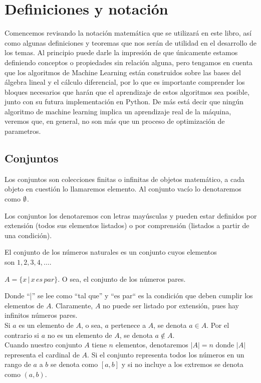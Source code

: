 \section{Definiciones y notación}

Comencemos revisando la notación matemática que se utilizará en este libro, así como algunas definiciones y teoremas que nos serán de utilidad en el desarrollo de los temas.
Al principio puede darle la impresión de que únicamente estamos definiendo conceptos o propiedades sin relación alguna, pero tengamos en cuenta 
que los algoritmos de Machine Learning están construidos sobre las bases del álgebra lineal y el cálculo diferencial, por lo que es importante
comprender los bloques necesarios que harán que el aprendizaje de estos algoritmos sea posible, junto con su futura implementación en Python.
De más está decir que ningún algoritmo de machine learning implica un aprendizaje real de la máquina, veremos que, en general, no son más que un proceso de optimización de parametros.

\subsection{Conjuntos}

\begin{definition}
    Los conjuntos son colecciones finitas o infinitas de objetos matemático, a cada objeto en cuestión lo llamaremos elemento. 
    Al conjunto vacío lo denotaremos como $\emptyset$.
\end{definition}

Los conjuntos los denotaremos con letras mayúsculas y pueden estar definidos por extensión (todos sus elementos listados) o por comprensión (listados a partir de una condición). 

\begin{eg}
    El conjunto de los números naturales es un conjunto cuyos elementos\\
    son $1, 2, 3, 4, \ldots$.
\end{eg}

\begin{eg}
    $A = \{x \, | \, x \, es \, par\}$. O sea, el conjunto de los números pares.
\end{eg}

Donde ``|'' se lee como ``tal que'' y ``es par`` es la condición que deben cumplir los elementos de $A$.
Claramente, $A$ no puede ser listado por extensión, pues hay infinitos números pares.\\
Si $a$ es un elemento de $A$, o sea, $a$ pertenece a $A$, se denota $a \in A$.
Por el contrario si $a$ no es un elemento de $A$, se denota $a \notin A$.\\
Cuando nuestro conjunto $A$ tiene $n$ elementos, denotaremos $|A| = n$ donde $|A|$ representa el cardinal de $A$.
Si el conjunto representa todos los números en un rango de $a$ a $b$ se denota como $[a, b]$ y si no incluye a los extremos se denota como $(a, b)$.

